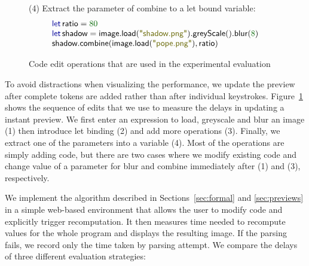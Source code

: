 \documentclass[english,crc]{programming}
\theoremstyle{plain}
\theoremstyle{definition}
\newcommand{\num}[1]{\textcolor{numclr}{#1}}
\newcommand{\str}[1]{\textnormal{\textcolor{strclr}{\sffamily "#1"}}}
\newcommand{\ident}[1]{\textnormal{\textcolor{idclr}{\sffamily #1}}}
\newcommand{\kvd}[1]{\textnormal{\textcolor{kvdclr}{\sffamily #1}}}
\begin{document}
\begin{figure}
{\small\sffamily (4) Extract the parameter of combine to a let bound variable:}
\vspace{-0.5em}
\begin{equation*}
\begin{array}{l}
\kvd{let}\,\ident{ratio} = \num{80} \\
\kvd{let}\,\ident{shadow}=\ident{image}.\ident{load}(\str{shadow.png}).\ident{greyScale}().\ident{blur}(\num{8})\\
\ident{shadow}.\ident{combine}(\ident{image}.\ident{load}(\str{pope.png}), \ident{ratio})
\end{array}
\end{equation*}

\vspace{-1em}
\caption{Code edit operations that are used in the experimental evaluation}
\label{fig:image-edits}
\vspace{-0.5em}
\end{figure}


To avoid distractions when visualizing the performance, we update the preview after complete tokens are
added rather than after individual keystrokes.
Figure~\ref{fig:image-edits} shows the sequence of edits that we use to measure
the delays in updating a instant preview. We first enter an expression to load, greyscale and blur
an image (1) then introduce let binding (2) and add more operations (3). Finally, we extract
one of the parameters into a variable (4). Most of the operations are simply adding code, but
there are two cases where we modify existing code and change value of a parameter for \ident{blur}
and \ident{combine} immediately after (1) and (3), respectively.

We implement the algorithm described in Sections~\ref{sec:formal} and \ref{sec:previews} in a
simple web-based environment that allows the user to modify code and explicitly trigger
recomputation. It then measures time needed to recompute values for the whole program and
displays the resulting image. If the parsing fails, we record only the time taken by parsing attempt. We compare the
delays of three different evaluation strategies:
\end{document}
